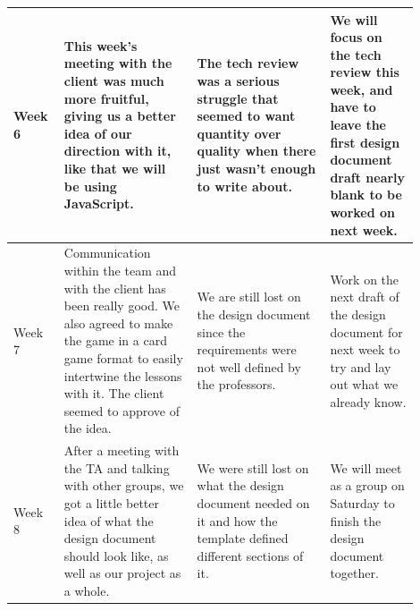 \documentclass[draftclsnofoot,10pt,onecolumn]{IEEEtran}
\begin{document}
\begin{longtable}{p{0.1\linewidth}p{0.3\linewidth}p{0.3\linewidth}p{0.2\linewidth}}
             Week 6
             & This week's meeting with the client was much more fruitful, giving us a better idea of our direction with it, like that we will be using JavaScript. 
             & The tech review was a serious struggle that seemed to want quantity over quality when there just wasn't enough to write about.
             & We will focus on the tech review this week, and have to leave the first design document draft nearly blank to be worked on next week. \\
            \hline
             Week 7
             & Communication within the team and with the client has been really good. We also agreed to make the game in a card game format to easily intertwine the lessons with it. The client seemed to approve of the idea.
             & We are still lost on the design document since the requirements were not well defined by the professors.
             & Work on the next draft of the design document for next week to try and lay out what we already know.\\
            \hline
             Week 8
             & After a meeting with the TA and talking with other groups, we got a little better idea of what the design document should look like, as well as our project as a whole.
             & We were still lost on what the design document needed on it and how the template defined different sections of it.
             & We will meet as a group on Saturday to finish the design document together.\\
        

\end{longtable}
\end{document}
